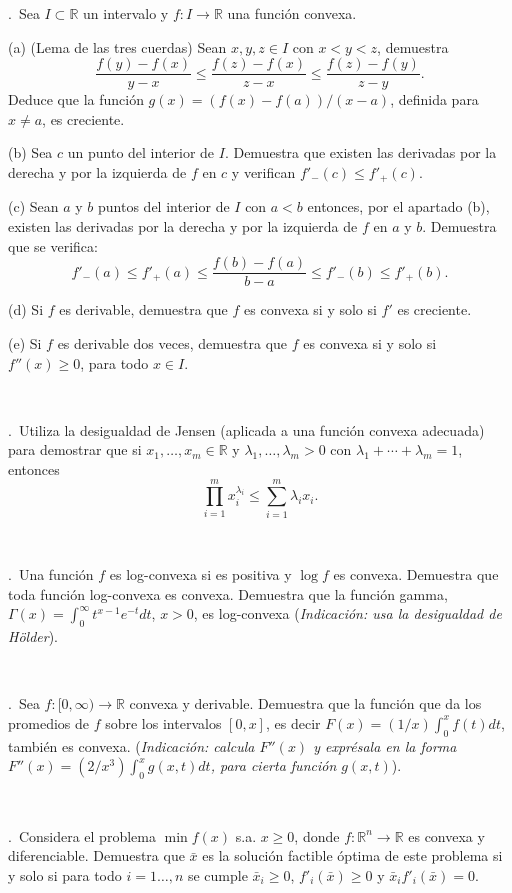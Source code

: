 \documentclass[11pt,a4paper,twoside]{article}
\newcounter{problem} \setcounter{problem}{1}
\newcommand{\ex}{\noindent {\sf \bf \theproblem}\addtocounter{problem}{1}.\ }
\begin{document}
\ex Sea $I\subset \mathbb{R}$ un intervalo y $f:I\to\mathbb{R}$ una función convexa.
\begin{compactitem}
\item[(a)] (Lema de las tres cuerdas)  Sean $x,y,z\in I$ con $x<y<z$, demuestra
\[
\frac{f(y)-f(x)}{y-x}\leq \frac{f(z)-f(x)}{z-x}\leq \frac{f(z)-f(y)}{z-y}.
\]
Deduce que la función $g(x)=(f(x)-f(a))/(x-a)$, definida para $x\neq a$, es creciente.
\item[(b)] Sea $c$ un punto del interior de $I$. Demuestra que existen las derivadas por la derecha y por la izquierda de $f$ en $c$ y verifican $f'_-(c)\leq f'_+(c)$.
\item[(c)] Sean $a$ y $b$ puntos del interior de $I$ con $a<b$ entonces, por el apartado (b), existen las derivadas por la derecha y por la izquierda de $f$ en $a$ y $b$. Demuestra que se verifica:
\[
f'_-(a)\leq f'_+(a)\leq \frac{f(b)-f(a)}{b-a} \leq f'_-(b)\leq f'_+(b).
\]
\item[(d)] Si $f$ es derivable, demuestra que $f$ es convexa si y solo si $f'$ es creciente.
\item[(e)] Si $f$ es derivable dos veces, demuestra que $f$ es convexa si y solo si $f''(x)\geq 0$, para todo $x\in I$.
\end{compactitem}




\
 
\ex Utiliza la desigualdad de Jensen (aplicada a una función convexa adecuada) para demostrar que si $x_1,\ldots,x_m \in\mathbb{R}$ y $\lambda_1,\ldots,\lambda_m>0$ con $\lambda_1+\cdots + \lambda_m=1$, entonces
\[
\prod_{i=1}^m x_i^{\lambda_i} \leq \sum_{i=1}^m \lambda_i x_i.
\]


\

\ex Una función $f$ es log-convexa si es positiva y $\log f$ es convexa. Demuestra que toda función log-convexa es convexa. Demuestra que la función gamma, $\Gamma(x)=\int_0^\infty t^{x-1} e^{-t} dt$, $x>0$, es log-convexa (\textit{Indicación: usa la desigualdad de Hölder}).


\
 
\ex Sea $f:[0,\infty)\to\mathbb{R}$ convexa y derivable. Demuestra que la función que da los promedios de $f$ sobre los intervalos $[0,x]$, es decir $F(x)=(1/x)\int_0^x f(t)dt$, también es convexa.  (\textit{Indicación: calcula $F''(x)$ y exprésala en la forma $F''(x)=(2/x^3)\int_0^x g(x,t)dt$, para cierta función $g(x,t)$}).

\
 
\ex Considera el problema $\min f(x)$ s.a. $x\geq 0$, donde $f:\mathbb{R}^n\to \mathbb{R}$ es convexa y diferenciable. Demuestra que $\bar{x}$ es la solución factible óptima de este problema si y solo si  para todo $i=1\ldots,n$ se cumple $\bar{x}_i\geq 0$,  $f'_i(\bar{x})\geq 0$ y $\bar{x}_if'_i(\bar{x})=0$.
\end{document}

